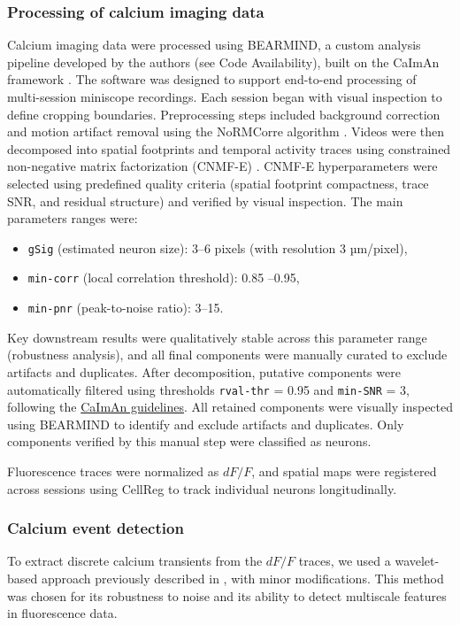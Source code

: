 \subsubsection{Processing of calcium imaging data}
\label{sec:calcium_processing}
Calcium imaging data were processed using BEARMIND, a custom analysis pipeline
developed by the authors (see Code Availability), built on the CaImAn framework
\cite{Pnevmatikakis2016}. The software was designed to support end-to-end processing of multi-session miniscope recordings.
Each session began with visual inspection to define cropping boundaries.
Preprocessing steps included background correction and motion artifact removal using the NoRMCorre algorithm \cite{Pnevmatikakis2017}. Videos were then decomposed into spatial footprints and temporal activity traces using constrained non-negative matrix factorization (CNMF-E) \cite{Zhou2018}. CNMF-E hyperparameters were selected using predefined quality criteria (spatial footprint compactness, trace SNR, and residual structure) and verified by visual inspection.  The main parameters ranges were:
\begin{itemize}
\item \texttt{gSig} (estimated neuron size): 3--6 pixels
(with resolution 3 µm/pixel),
\item \texttt{min-corr} (local correlation threshold):
0.85 --0.95,
\item \texttt{min-pnr} (peak-to-noise ratio): 3--15.
\end{itemize}
Key downstream results were qualitatively stable across this parameter range (robustness analysis), and all final components were manually curated to exclude artifacts and duplicates. 
After decomposition, putative components were automatically filtered using
thresholds \texttt{rval-thr} = 0.95 and \texttt{min-SNR} = 3, following the
\href{https://caiman.readthedocs.io/en/latest/CaImAn\_Tips.html}{CaImAn guidelines}.
All retained components were visually inspected using BEARMIND to identify and
exclude artifacts and duplicates. Only components verified by this manual step were
classified as neurons.

Fluorescence traces were normalized as $dF/F$, and spatial maps were registered
across sessions using CellReg \cite{Sheintuch2017} to track individual neurons
longitudinally.

\subsubsection{Calcium event detection}
\label{sec:calcium_event_detection}
To extract discrete calcium transients from the $dF/F$ traces, we used a
wavelet-based approach previously described in \cite{Neugornet2021}, with minor
modifications. This method was chosen for its robustness to noise and its ability to
detect multiscale features in fluorescence data.


